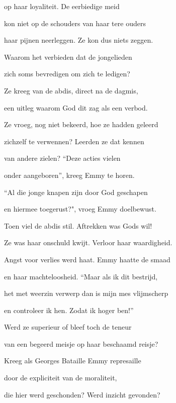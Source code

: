 op haar loyaliteit.
De eerbiedige meid

kon niet op de schouders
van haar tere ouders

haar pijnen neerleggen.
Ze kon dus niets zeggen.

Waarom het verbieden
dat de jongelieden

zich soms bevredigen
om zich te ledigen?

Ze kreeg van de abdis,
direct na de dagmis,

een uitleg waarom God
dit zag als een verbod.

Ze vroeg, nog niet bekeerd,
hoe ze hadden geleerd

zichzelf te verwennen?
Leerden ze dat kennen

van andere zielen?
“Deze acties vielen

onder aangeboren”,
kreeg Emmy te horen.

“Al die jonge knapen
zijn door God geschapen

en hiermee toegerust?",
vroeg Emmy doelbewust.

Toen viel de abdis stil.
Aftrekken was Gods wil!

Ze was haar onschuld kwijt.
Verloor haar waardigheid.

Angst voor verlies werd haat.
Emmy haatte de smaad

en haar machteloosheid.
“Maar als ik dit bestrijd,

het met weerzin verwerp
dan is mijn mes vlijmscherp

en controleer ik hen.
Zodat ik hoger ben!”

Werd ze superieur
of bleef toch de teneur

van een begeerd meisje
op haar beschaamd reisje?

Kreeg als Georges Bataille
Emmy represaille

door de expliciteit
van de moraliteit,

die hier werd geschonden?
Werd inzicht gevonden?
